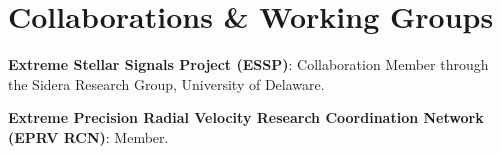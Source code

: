 \section{Collaborations \& Working Groups}

\begin{onecolentry}
\begin{highlights}
    \item \textbf{Extreme Stellar Signals Project (ESSP)}: Collaboration Member through the Sidera Research Group, University of Delaware.
    \item \textbf{Extreme Precision Radial Velocity Research Coordination Network (EPRV RCN)}: Member.
\end{highlights}
\end{onecolentry}
